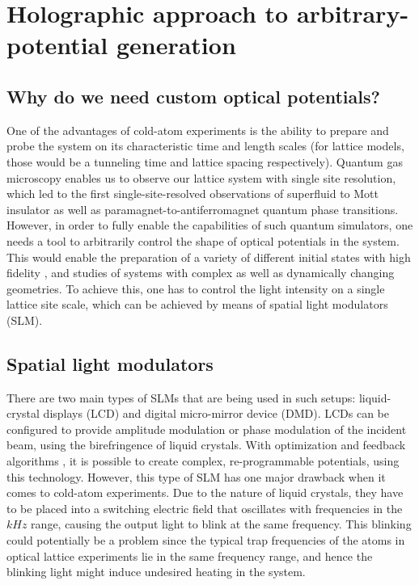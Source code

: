
\chapter{Holographic approach to arbitrary-potential generation}

\section{Why do we need custom optical potentials?}
One of the advantages of cold-atom experiments is the ability to prepare and probe the system on its characteristic time and length scales (for lattice models, those would be a tunneling time and lattice spacing respectively). Quantum gas microscopy enables us to observe our lattice system with single site resolution, which led to the first single-site-resolved observations of superfluid to Mott insulator \cite{Bakr2010, Sherson2010} as well as paramagnet-to-antiferromagnet \cite{Simon2011, Parsons2016} quantum phase transitions. However, in order to fully enable the capabilities of such quantum simulators, one needs a tool to arbitrarily control the shape of optical potentials in the system. This would enable the preparation of a variety of different initial states with high fidelity \cite{us, somebody else?}, and studies of systems with complex \cite{Tilman QPC, Roatti QPC} as well as dynamically changing \cite{Boyer2006} geometries. To achieve this, one has to control the light intensity on a single lattice site scale, which can be achieved by means of spatial light modulators (SLM).

\section{Spatial light modulators}
There are two main types of SLMs that are being used in such setups: liquid-crystal displays (LCD) and digital micro-mirror device (DMD). LCDs can be configured to provide amplitude modulation or phase modulation of the incident beam, using the birefringence of liquid crystals. With optimization and feedback algorithms \cite{Gaunt2012, Nogrette2014}, it is possible to create complex, re-programmable potentials, using this technology. However, this type of SLM has one major drawback when it comes to cold-atom experiments. Due to the nature of liquid crystals, they have to be placed into a switching electric field that oscillates with frequencies in the $kHz$ range, causing the output light to blink at the same frequency. This blinking could potentially be a problem since the typical trap frequencies of the atoms in optical lattice experiments lie in the same frequency range, and hence the blinking light might induce undesired heating in the system.

